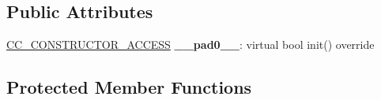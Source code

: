 \subsection*{Public Attributes}
\begin{DoxyCompactItemize}
\item 
\mbox{\label{classui_1_1Text_a7d3ae7d016d5e7afac3fdb50378402a7}} 
\hyperlink{_2cocos2d_2cocos_2base_2ccConfig_8h_a25ef1314f97c35a2ed3d029b0ead6da0}{C\+C\+\_\+\+C\+O\+N\+S\+T\+R\+U\+C\+T\+O\+R\+\_\+\+A\+C\+C\+E\+SS} {\bfseries \+\_\+\+\_\+pad0\+\_\+\+\_\+}\+: virtual bool init() override
\end{DoxyCompactItemize}
\subsection*{Protected Member Functions}
